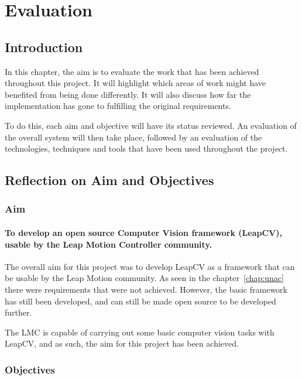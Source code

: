 \documentclass[11pt,oneside]{report}
\begin{document}
	\chapter{Evaluation}\label{chap:eval}
	\section{Introduction}
	In this chapter, the aim is to evaluate the work that has been achieved throughout this project.
	It will highlight which areas of work might have benefited from being done differently.
	It will also discuss how far the implementation has gone to fulfilling the original requirements.
	
	To do this, each aim and objective will have its status reviewed.
	An evaluation of the overall system will then take place, followed by an evaluation of the technologies, techniques and tools that have been used throughout the project.

	\section{Reflection on Aim and Objectives}
	\subsection{Aim}
		\subsubsection{To develop an open source Computer Vision framework (LeapCV), usable by the Leap Motion Controller community.}
		The overall aim for this project was to develop LeapCV as a framework that can be usable by the Leap Motion community.
		As seen in the chapter~\ref{chap:unac} there were requirements that were not achieved.
		However, the basic framework has still been developed, and can still be made open source to be developed further.
		
		The LMC is capable of carrying out some basic computer vision tasks with LeapCV, and as such, the aim for this project has been achieved.
		
	\subsection{Objectives} 
\end{document}
